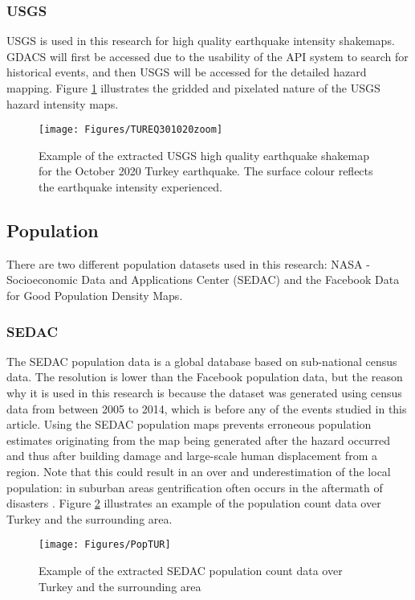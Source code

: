 \documentclass[10pt,a4paper]{article}
\begin{document}
\begin{multicols}{1}
\subsubsection{USGS}\label{sec:USGS}
USGS is used in this research for high quality earthquake intensity shakemaps. GDACS will first be accessed due to the usability of the API system to search for historical events, and then USGS will be accessed for the detailed hazard mapping. Figure \ref{fig:USGS} illustrates the gridded and pixelated nature of the USGS hazard intensity maps.
\begin{figure}[H]
   \texttt{[image: Figures/TUREQ301020zoom]}
 	\caption{Example of the extracted USGS high quality earthquake shakemap for the October 2020 Turkey earthquake. The surface colour reflects the earthquake intensity experienced.}
 	\label{fig:USGS}
\end{figure}
\subsection{Population}\label{sec:Population}
There are two different population datasets used in this research: NASA - Socioeconomic Data and Applications Center (SEDAC) and the Facebook Data for Good Population Density Maps.
\subsubsection{SEDAC}\label{sec:SEDAC}
The SEDAC population data is a global database based on sub-national census data. The resolution is lower than the Facebook population data, but the reason why it is used in this research is because the dataset was generated using census data from between 2005 to 2014, which is before any of the events studied in this article. Using the SEDAC population maps prevents erroneous population estimates originating from the map being generated after the hazard occurred and thus after building damage and large-scale human displacement from a region. Note that this could result in an over and underestimation of the local population: in suburban areas gentrification often occurs in the aftermath of disasters \cite{EQgent}. Figure \ref{fig:Pop} illustrates an example of the population count data over Turkey and the surrounding area.

\begin{figure}[H]
   \texttt{[image: Figures/PopTUR]}
 	\caption{Example of the extracted SEDAC population count data over Turkey and the surrounding area}
 	\label{fig:Pop}
\end{figure}


\end{multicols}
\end{document}
